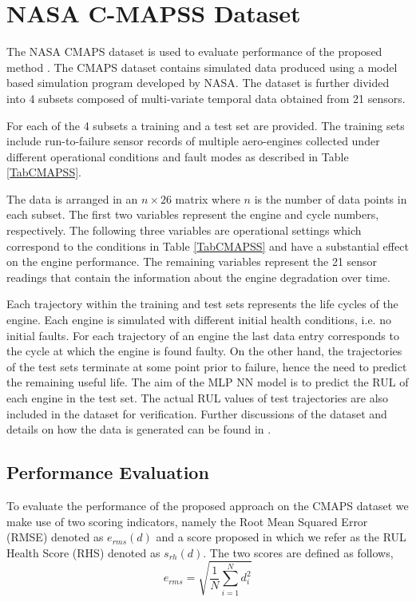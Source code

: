 \documentclass[12pt]{IEEEtran}%
\begin{document}
\section{NASA C-MAPSS Dataset}

\label{sec:rul_dataset}

The NASA CMAPS dataset is used to evaluate performance of the proposed method
\cite{CMAPS2008}. The CMAPS dataset contains simulated data produced using a
model based simulation program developed by NASA. The dataset is further
divided into 4 subsets composed of multi-variate temporal data obtained from
21 sensors.

For each of the 4 subsets a training and a test set are provided. The training
sets include run-to-failure sensor records of multiple aero-engines collected
under different operational conditions and fault modes as described in Table
\ref{TabCMAPSS}.

The data is arranged in an $n\times26$ matrix where $n$ is the number of data
points in each subset. The first two variables represent the engine and cycle
numbers, respectively. The following three variables are operational settings
which correspond to the conditions in Table \ref{TabCMAPSS} and have a
substantial effect on the engine performance. The remaining variables
represent the 21 sensor readings that contain the information about the engine
degradation over time.

Each trajectory within the training and test sets represents the life cycles
of the engine. Each engine is simulated with different initial health
conditions, i.e. no initial faults. For each trajectory of an engine the last
data entry corresponds to the cycle at which the engine is found faulty. On
the other hand, the trajectories of the test sets terminate at some point
prior to failure, hence the need to predict the remaining useful life. The aim
of the MLP NN model is to predict the RUL of each engine in the test set. The
actual RUL values of test trajectories are also included in the dataset for
verification. Further discussions of the dataset and details on how the data
is generated can be found in \cite{Saxena2008}.

\subsection{Performance Evaluation}

\label{sec:rul_metrics}

To evaluate the performance of the proposed approach on the CMAPS dataset we
make use of two scoring indicators, namely the Root Mean Squared Error (RMSE)
denoted as $e_{rms}(d)$ and a score proposed in \cite{Saxena2008} which we
refer as the RUL Health Score (RHS) denoted as $s_{rh}(d)$. The two scores are
defined as follows,
\begin{equation}
e_{rms} = \sqrt{ \frac{1}{N} \sum_{i=1}^{N}{d_{i}^{2}}} \label{eq:rmse}%
\end{equation}
%
\end{document}
